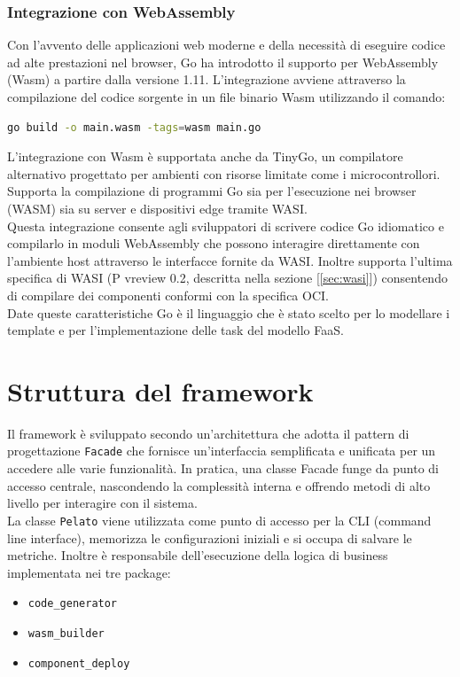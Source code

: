 \subsubsection{Integrazione con WebAssembly}
Con l'avvento delle applicazioni web moderne e della necessità di eseguire codice ad alte prestazioni nel browser, Go ha introdotto il supporto per WebAssembly (Wasm) a partire dalla versione 1.11. L'integrazione avviene attraverso la compilazione del codice sorgente in un file binario Wasm utilizzando il comando:

\begin{lstlisting}[language=bash]
go build -o main.wasm -tags=wasm main.go
\end{lstlisting}

L'integrazione con Wasm è supportata anche da TinyGo, un compilatore alternativo progettato per ambienti con risorse limitate come i microcontrollori. Supporta la compilazione di programmi Go sia per l'esecuzione nei browser (WASM) sia su server e dispositivi edge tramite WASI.\\
Questa integrazione consente agli sviluppatori di scrivere codice Go idiomatico e compilarlo in moduli WebAssembly che possono interagire direttamente con l'ambiente host attraverso le interfacce fornite da WASI. Inoltre supporta l'ultima specifica di WASI (P vreview 0.2, descritta nella sezione [\ref{sec:wasi}]) consentendo di compilare dei componenti conformi con la specifica OCI.\\
Date queste caratteristiche Go è il linguaggio che è stato scelto per lo modellare i template e per l'implementazione delle task del modello FaaS.

\section{Struttura del framework}

Il framework è sviluppato secondo un'architettura che adotta il pattern di progettazione \texttt{Facade} che fornisce un'interfaccia semplificata e unificata per un accedere alle varie funzionalità. In pratica, una classe Facade funge da punto di accesso centrale, nascondendo la complessità interna e offrendo metodi di alto livello per interagire con il sistema.\\
La classe \texttt{Pelato} viene utilizzata come punto di accesso per la CLI (command line interface), memorizza le configurazioni iniziali e si occupa di salvare le metriche. Inoltre è responsabile dell'esecuzione della logica di business implementata nei tre package:
\begin{itemize}
    \item \texttt{code\_generator}
    \item \texttt{wasm\_builder}
    \item \texttt{component\_deploy}
\end{itemize}

